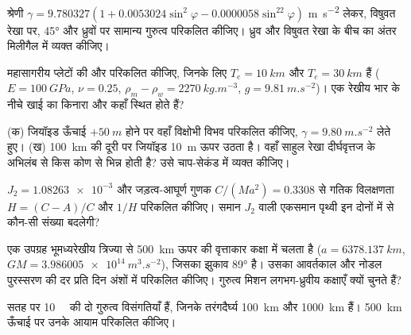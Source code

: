 \begin{exercise}[$\star$]\label{exo:b3:gravity-geodesy:3}
श्रेणी $\gamma = 9.780327(1 + 0.0053024\sin^2\varphi -
0.0000058\sin^22\varphi)$ \unit{m.s^{-2}} लेकर, विषुवत रेखा पर,
\ang{45} और ध्रुवों पर सामान्य गुरुत्व परिकलित कीजिए। ध्रुव और विषुवत रेखा के बीच
का अंतर मिलीगैल में व्यक्त कीजिए।
\end{exercise}

\begin{exercise}[$\star$]\label{exo:b3:gravity-geodesy:4}
महासागरीय प्लेटों की  और  परिकलित कीजिए, जिनके लिए
$T_e = \qty{10}{km}$ और $T_e = \qty{30}{km}$ हैं ($E = \qty{100}{GPa}$,
$\nu = 0.25$, $\rho_m - \rho_w = \qty{2270}{kg.m^{-3}}$, $g =
\qty{9.81}{m.s^{-2}}$)। एक रेखीय भार के नीचे खाई का किनारा और 
कहाँ स्थित होते हैं?
\end{exercise}

\begin{exercise}[$\star\star$]\label{exo:b3:gravity-geodesy:5}
(क) जियॉइड ऊँचाई $+\qty{50}{m}$ होने पर वहाँ विक्षोभी विभव परिकलित कीजिए,
$\gamma = \qty{9.80}{m.s^{-2}}$ लेते हुए। (ख) \qty{100}{km} की दूरी पर जियॉइड
\qty{10}{m} ऊपर उठता है। वहाँ साहुल रेखा दीर्घवृत्तज के अभिलंब से
किस कोण से भिन्न होती है? उसे चाप-सेकंड में व्यक्त कीजिए।
\end{exercise}

\begin{exercise}[$\star\star$]\label{exo:b3:gravity-geodesy:6}
$J_2 = \num{1.08263e-3}$ और जड़त्व-आघूर्ण गुणक
$C/(Ma^2) = \num{0.3308}$ से गतिक विलक्षणता $H = (C - A)/C$ और
$1/H$ परिकलित कीजिए। समान $J_2$ वाली एकसमान पृथ्वी इन दोनों में से कौन-सी संख्या बदलेगी?
\end{exercise}

\begin{exercise}[$\star\star$]\label{exo:b3:gravity-geodesy:7}
एक उपग्रह भूमध्यरेखीय त्रिज्या से \qty{500}{km} ऊपर की वृत्ताकार कक्षा में
चलता है ($a = \qty{6378.137}{km}$, $GM = \qty{3.986005e14}{m^3.s^{-2}}$), जिसका झुकाव \ang{89} है।
उसका आवर्तकाल और नोडल पुरस्सरण की दर प्रति दिन अंशों में परिकलित कीजिए।
गुरुत्व मिशन लगभग-ध्रुवीय कक्षाएँ क्यों चुनते हैं?
\end{exercise}

\begin{exercise}[$\star\star$]\label{exo:b3:gravity-geodesy:8}
सतह पर \qty{10}{\milli\gal} की दो गुरुत्व विसंगतियाँ हैं, जिनके तरंगदैर्घ्य
\qty{100}{km} और \qty{1000}{km} हैं। \qty{500}{km} ऊँचाई पर उनके आयाम
परिकलित कीजिए।
\end{exercise}


